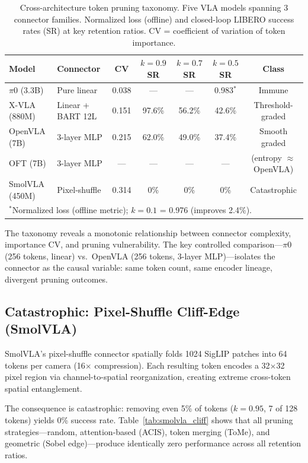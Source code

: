 \documentclass[letterpaper]{article}
\begin{document}
\begin{table}[t]
\centering
\caption{Cross-architecture token pruning taxonomy. Five VLA models spanning 3 connector families. Normalized loss (offline) and closed-loop LIBERO success rates (SR) at key retention ratios. CV = coefficient of variation of token importance.}
\label{tab:taxonomy}
\small
\begin{tabular}{@{}llccccc@{}}
\toprule
\textbf{Model} & \textbf{Connector} & \textbf{CV} & \textbf{$k{=}0.9$ SR} & \textbf{$k{=}0.7$ SR} & \textbf{$k{=}0.5$ SR} & \textbf{Class} \\
\midrule
$\pi$0 (3.3B) & Pure linear & 0.038 & --- & --- & 0.983$^*$ & Immune \\
X-VLA (880M) & Linear + BART 12L & 0.151 & 97.6\% & 56.2\% & 42.6\% & Threshold-graded \\
OpenVLA (7B) & 3-layer MLP & 0.215 & 62.0\% & 49.0\% & 37.4\% & Smooth graded \\
OFT (7B) & 3-layer MLP & --- & --- & --- & --- & (entropy $\approx$ OpenVLA) \\
SmolVLA (450M) & Pixel-shuffle & 0.314 & 0\% & 0\% & 0\% & Catastrophic \\
\bottomrule
\multicolumn{7}{l}{\footnotesize $^*$Normalized loss (offline metric); $k{=}0.1$ = 0.976 (improves 2.4\%).}
\end{tabular}
\end{table}

The taxonomy reveals a monotonic relationship between connector complexity, importance CV, and pruning vulnerability. The key controlled comparison---$\pi$0 (256 tokens, linear) vs.\ OpenVLA (256 tokens, 3-layer MLP)---isolates the connector as the causal variable: same token count, same encoder lineage, divergent pruning outcomes.

\subsection{Catastrophic: Pixel-Shuffle Cliff-Edge (SmolVLA)}

SmolVLA's pixel-shuffle connector spatially folds 1024 SigLIP patches into 64 tokens per camera (16$\times$ compression). Each resulting token encodes a 32$\times$32 pixel region via channel-to-spatial reorganization, creating extreme cross-token spatial entanglement.

The consequence is catastrophic: removing even 5\% of tokens ($k{=}0.95$, 7 of 128 tokens) yields 0\% success rate. Table~\ref{tab:smolvla_cliff} shows that all pruning strategies---random, attention-based (ACIS), token merging (ToMe), and geometric (Sobel edge)---produce identically zero performance across all retention ratios.
\end{document}
